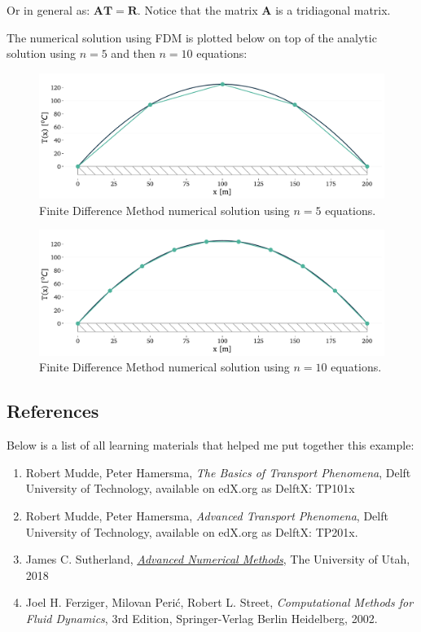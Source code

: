 Or in general as: $\mathbf{A} \mathbf{T} = \mathbf{R}$. Notice that the matrix $\mathbf{A}$ is a tridiagonal matrix. 

The numerical solution using FDM is plotted below on top of the analytic solution using $n=5$ and then $n=10$ equations:

\begin{figure}[H]
\centering\includegraphics[width=12cm]{figures/example-heat-transfer-in-a-rod-FDM-n5.pdf}
\caption{Finite Difference Method numerical solution using $n=5$ equations.}
\label{fig:FDM-solution}
\end{figure}

\begin{figure}[H]
\centering\includegraphics[width=12cm]{figures/example-heat-transfer-in-a-rod-FDM-n10.pdf}
\caption{Finite Difference Method numerical solution using $n=10$ equations.}
\label{fig:FDM-solution}
\end{figure}

\subsection{References}

Below is a list of all learning materials that helped me put together this example:

\begin{enumerate}
\item Robert Mudde, Peter Hamersma, \textit{The Basics of Transport Phenomena}, Delft University of Technology, available on edX.org as DelftX: TP101x
\item Robert Mudde, Peter Hamersma, \textit{Advanced Transport Phenomena}, Delft University of Technology, available on edX.org as DelftX: TP201x.
\item James C. Sutherland, \textit{\href{https://sutherland.che.utah.edu/teaching/chen6703/lectures-schedule/}{Advanced Numerical Methods}}, The University of Utah, 2018
\item Joel H. Ferziger, Milovan Perić, Robert L. Street, \textit{Computational Methods for Fluid Dynamics}, 3rd Edition, Springer-Verlag Berlin Heidelberg, 2002.
\end{enumerate}

